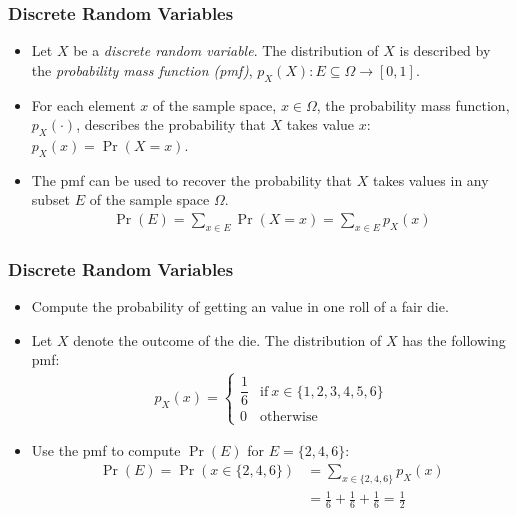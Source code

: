 \begin{frame}
\frametitle{Discrete Random Variables}
\begin{itemize}
\item Let $X$ be a \emph{discrete random variable}. The distribution of $X$ is described by the \emph{probability mass function (pmf)}, $p_{X}(X)\colon E \subseteq \Omega \to[0,1]$.
\item For each element $x$ of the sample space, $x\in \Omega$, the probability mass function, $p_X(\cdot)$, describes the probability that $X$ takes value $x$: $p_X(x) = \Pr(X=x)$.
\item The pmf can be used to recover the probability that $X$ takes values in any subset $E$ of the sample space $\Omega$.
\begin{align*}
\Pr(E) 
    = \sum_{x\in E} \Pr(X=x) 
    = \sum_{x\in E}p_X(x) 
\end{align*}
\end{itemize}
\end{frame}


\begin{frame}
\frametitle{Discrete Random Variables} 
\begin{itemize}
\item Compute the probability of getting an value in one roll of a fair die.
\item Let $X$ denote the outcome of the die. The distribution of $X$ has the following pmf:
\begin{align*}
p_X(x) = 
  \begin{cases}
  \dfrac{1}{6}  & \text{if}~ x \in \{1,2,3,4,5,6\}\\[1ex]
              0 & \text{otherwise}
  \end{cases}
\end{align*}
\item Use the pmf to compute $\Pr(E)$ for $E=\{2,4,6\}$:
\begin{align*}
\Pr(E) = 
\Pr(x \in \{2,4,6\}) 
  & = \sum_{x \in \{2,4,6\}} p_X(x)\\
  & = \frac{1}{6} + \frac{1}{6} + \frac{1}{6}
    = \frac{1}{2}
\end{align*}
\end{itemize}
\end{frame}


